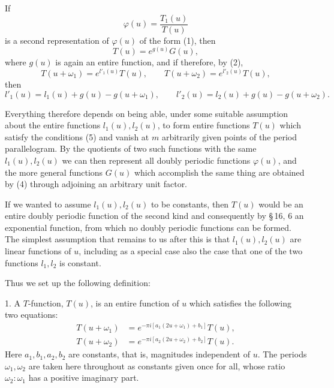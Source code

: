 \documentclass[11pt]{article}
\begin{document}
If
\begin{equation}
\varphi(u)=\frac{T_1(u)}{T(u)}
\tag{3}
\end{equation}
is a second representation of $\varphi(u)$ of the form (1), then
\begin{equation}
T(u)=e^{g(u)}G(u),
\tag{4}
\end{equation}
where $g(u)$ is again an entire function, and if therefore, by (2),
\begin{equation}
T(u+\omega_1)=e^{l'_1(u)}T(u),\qquad
T(u+\omega_2)=e^{l'_2(u)}T(u),
\tag{5}
\end{equation}
then
\[
l'_1(u)=l_1(u)+g(u)-g(u+\omega_1),\qquad
l'_2(u)=l_2(u)+g(u)-g(u+\omega_2).
\]

Everything therefore depends on being able, under some suitable assumption about the entire functions $l_1(u),l_2(u)$, to form entire functions $T(u)$ which satisfy the conditions (5) and vanish at $m$ arbitrarily given points of the period parallelogram. By the quotients of two such functions with the same $l_1(u),l_2(u)$ we can then represent all doubly periodic functions $\varphi(u)$, and the more general functions $G(u)$ which accomplish the same thing are obtained by (4) through adjoining an arbitrary unit factor.

If we wanted to assume $l_1(u),l_2(u)$ to be constants, then $T(u)$ would be an entire doubly periodic function of the second kind and consequently by \S\,16, 6 an exponential function, from which no doubly periodic functions can be formed. The simplest assumption that remains to us after this is that $l_1(u),l_2(u)$ are linear functions of $u$, including as a special case also the case that one of the two functions $l_1,l_2$ is constant.

Thus we set up the following definition:

1. A $T$-function, $T(u)$, is an entire function of $u$ which satisfies the following two equations:
\begin{equation}
\begin{aligned}
T(u+\omega_1)&=e^{-\pi i[a_1(2u+\omega_1)+b_1]}T(u),\\
T(u+\omega_2)&=e^{-\pi i[a_2(2u+\omega_2)+b_2]}T(u).
\end{aligned}
\tag{6}
\end{equation}
Here $a_1,b_1,a_2,b_2$ are constants, that is, magnitudes independent of $u$. The periods $\omega_1,\omega_2$ are taken here throughout as constants given once for all, whose ratio $\omega_2:\omega_1$ has a positive imaginary part.
\end{document}
